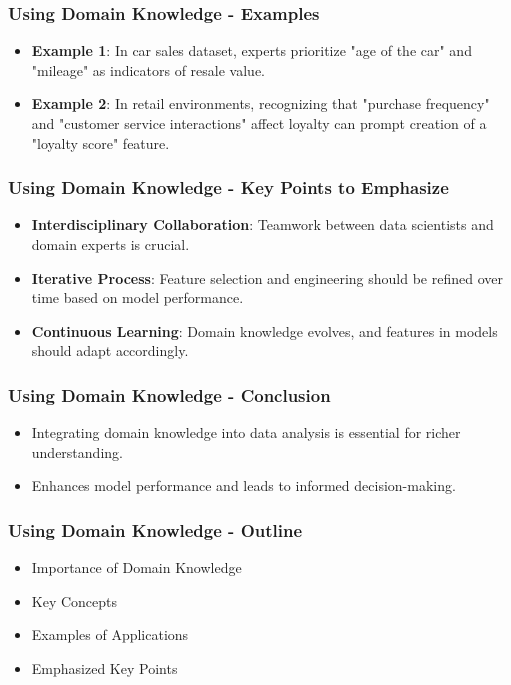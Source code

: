 \documentclass[aspectratio=169]{beamer}
\begin{document}
\begin{frame}[fragile]
    \frametitle{Using Domain Knowledge - Examples}
    \begin{itemize}
        \item \textbf{Example 1}:
        In car sales dataset, experts prioritize "age of the car" and "mileage" as indicators of resale value.
        
        \item \textbf{Example 2}:
        In retail environments, recognizing that "purchase frequency" and "customer service interactions" affect loyalty can prompt creation of a "loyalty score" feature.
    \end{itemize}
\end{frame}

\begin{frame}[fragile]
    \frametitle{Using Domain Knowledge - Key Points to Emphasize}
    \begin{itemize}
        \item \textbf{Interdisciplinary Collaboration}:
        Teamwork between data scientists and domain experts is crucial.
        
        \item \textbf{Iterative Process}:
        Feature selection and engineering should be refined over time based on model performance.
        
        \item \textbf{Continuous Learning}:
        Domain knowledge evolves, and features in models should adapt accordingly.
    \end{itemize}
\end{frame}

\begin{frame}[fragile]
    \frametitle{Using Domain Knowledge - Conclusion}
    \begin{itemize}
        \item Integrating domain knowledge into data analysis is essential for richer understanding.
        \item Enhances model performance and leads to informed decision-making.
    \end{itemize}
\end{frame}

\begin{frame}[fragile]
    \frametitle{Using Domain Knowledge - Outline}
    \begin{itemize}
        \item Importance of Domain Knowledge
        \item Key Concepts
        \item Examples of Applications
        \item Emphasized Key Points
    \end{itemize}
\end{frame}
\end{document}
